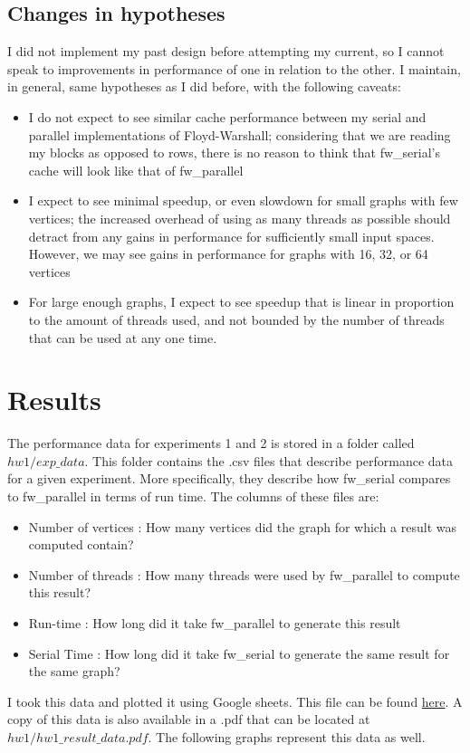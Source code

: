 \documentclass[]{article}
\begin{document}
	\subsection{Changes in hypotheses}
	I did not implement my past design before attempting my current, so I cannot speak to improvements in performance of one in relation to the other. I maintain, in general, same hypotheses as I did before, with the following caveats:
	\begin{itemize}
		\item I do not expect to see similar cache performance between my serial and parallel implementations of Floyd-Warshall; considering that we are reading my blocks as opposed to rows, there is no reason to think that fw\_serial's cache will look like that of fw\_parallel
		\item I expect to see minimal speedup, or even slowdown for small graphs with few vertices; the increased overhead of using as many threads as possible should detract from any gains in performance for sufficiently small input spaces. However, we may see gains in performance for graphs with 16, 32, or 64 vertices
		\item For large enough graphs, I expect to see speedup that is linear in proportion to the amount of threads used, and not bounded by the number of threads that can be used at any one time.
	\end{itemize}
\section{Results}
	The performance data for experiments 1 and 2 is stored in a folder called $hw1/exp\_data$. This folder contains the .csv files that describe performance data for a given experiment. More specifically, they describe how fw\_serial compares to fw\_parallel in terms of run time. The columns of these files are:
	\begin{itemize}
		\item Number of vertices : How many vertices did the graph for which a result was computed contain?
		\item Number of threads : How many threads were used by fw\_parallel to compute this result?
		\item Run-time : How long did it take fw\_parallel to generate this result
		\item Serial Time : How long did it take fw\_serial to generate the same result for the same graph?
	\end{itemize}
	I took this data and plotted it using Google sheets. This file can be found \href{https://docs.google.com/spreadsheets/d/1XrjW1c_qoefwkYxm_nAwCrnQ4Z4TFlYyeFtUYgdvXZE/edit?usp=sharing}{here}. A copy of this data is also available in a .pdf that can be located at $hw1/hw1\_result\_data.pdf$. The following graphs represent this data as well.
	
\end{document}

